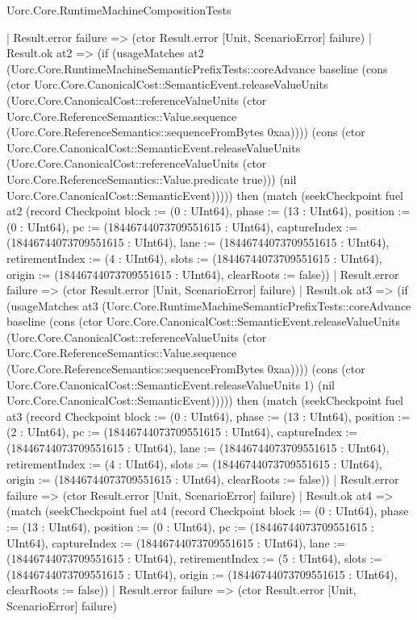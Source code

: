 \begin{lexlean}{Uorc.Core.RuntimeMachineCompositionTests}
\begin{semanticmodule}
{              | Result.error failure => (ctor Result.error [Unit, ScenarioError] failure)
              | Result.ok at2 => (if (usageMatches at2 (Uorc.Core.RuntimeMachineSemanticPrefixTests::coreAdvance baseline (cons (ctor Uorc.Core.CanonicalCost::SemanticEvent.releaseValueUnits (Uorc.Core.CanonicalCost::referenceValueUnits (ctor Uorc.Core.ReferenceSemantics::Value.sequence (Uorc.Core.ReferenceSemantics::sequenceFromBytes 0xaa)))) (cons (ctor Uorc.Core.CanonicalCost::SemanticEvent.releaseValueUnits (Uorc.Core.CanonicalCost::referenceValueUnits (ctor Uorc.Core.ReferenceSemantics::Value.predicate true))) (nil Uorc.Core.CanonicalCost::SemanticEvent))))) then (match (seekCheckpoint fuel at2 (record Checkpoint {block := (0 : UInt64), phase := (13 : UInt64), position := (0 : UInt64), pc := (18446744073709551615 : UInt64), captureIndex := (18446744073709551615 : UInt64), lane := (18446744073709551615 : UInt64), retirementIndex := (4 : UInt64), slots := (18446744073709551615 : UInt64), origin := (18446744073709551615 : UInt64), clearRoots := false}))
                | Result.error failure => (ctor Result.error [Unit, ScenarioError] failure)
                | Result.ok at3 => (if (usageMatches at3 (Uorc.Core.RuntimeMachineSemanticPrefixTests::coreAdvance baseline (cons (ctor Uorc.Core.CanonicalCost::SemanticEvent.releaseValueUnits (Uorc.Core.CanonicalCost::referenceValueUnits (ctor Uorc.Core.ReferenceSemantics::Value.sequence (Uorc.Core.ReferenceSemantics::sequenceFromBytes 0xaa)))) (cons (ctor Uorc.Core.CanonicalCost::SemanticEvent.releaseValueUnits 1) (nil Uorc.Core.CanonicalCost::SemanticEvent))))) then (match (seekCheckpoint fuel at3 (record Checkpoint {block := (0 : UInt64), phase := (13 : UInt64), position := (2 : UInt64), pc := (18446744073709551615 : UInt64), captureIndex := (18446744073709551615 : UInt64), lane := (18446744073709551615 : UInt64), retirementIndex := (4 : UInt64), slots := (18446744073709551615 : UInt64), origin := (18446744073709551615 : UInt64), clearRoots := false}))
                  | Result.error failure => (ctor Result.error [Unit, ScenarioError] failure)
                  | Result.ok at4 => (match (seekCheckpoint fuel at4 (record Checkpoint {block := (0 : UInt64), phase := (13 : UInt64), position := (0 : UInt64), pc := (18446744073709551615 : UInt64), captureIndex := (18446744073709551615 : UInt64), lane := (18446744073709551615 : UInt64), retirementIndex := (5 : UInt64), slots := (18446744073709551615 : UInt64), origin := (18446744073709551615 : UInt64), clearRoots := false}))
                    | Result.error failure => (ctor Result.error [Unit, ScenarioError] failure)
}
\end{semanticmodule}
\end{lexlean}
